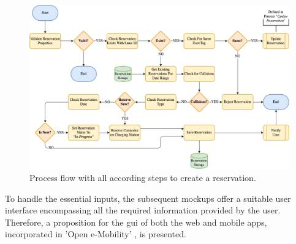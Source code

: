 \begin{figure}[h]
    \centering
    \includegraphics[scale=0.4]{resources/images/main/5_design/processes/ReservationCreate.png}
    \caption{Process flow with all according steps to create a reservation.}
    \label{fig:create-reservation-flowchart}
\end{figure}

\noindent To handle the essential inputs, the subsequent mockups offer a suitable user interface encompassing all the required information provided by the user. Therefore, a proposition for the \acrshort{gui} of both the web and mobile apps, incorporated in 'Open e-Mobility' \cite{noauthor_open_2023}, is presented.

